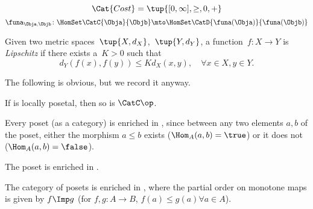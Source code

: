 {\begin{forslides}
\begin{equation*}
            \Cat{Cost}=\tup{[0,\infty], \geq, 0, +}
        \end{equation*}
        \begin{equation*}
            \label{eq:enriched_fun_a}
            \funa_{\Obja, \Objb} \colon \HomSet\CatC{\Obja}{\Objb} \mto \HomSet\CatD{\funa(\Obja)}{\funa(\Objb)}
        \end{equation*}
        \begin{definition}
            \label{def:cost_enrich_a}
            Given two metric spaces~$\tup{X,d_X}$,~$\tup{Y,d_Y}$, a function~$f\colon X\to Y$ is \emph{Lipschitz} if there exists a~$K>0$ such that
            \begin{equation}
                d_Y(f(x),f(y))\leq Kd_X(x,y),\quad \forall x\in X,y\in Y.
            \end{equation}
        \end{definition}
    \end{forslides}
}

%
The following is obvious, but we record it anyway.
\begin{lemma}
    \label{lem:loc_pos_op}
    If \CatC is locally posetal, then so is $\CatC\op$.
\end{lemma}

\begin{example}
    \label{ex:enrichbool}Every poset (as a category) is enriched in \Bool, since between any two elements $a,b$ of the poset, either the morphism $a \leq b$ exists ($\Hom_A(a,b) = \true$) or it does not ($\Hom_A(a,b) = \false$).
\end{example}

\begin{example}
    The poset \Bool is enriched in \Bool.
\end{example}

\begin{example}
    The category \Pos of posets is enriched in \Pos, where the partial order on monotone maps is given by $f \Imp g$ (\ie  for $f,g : A \to B$, $f(a) \leq g(a) \forall a \in A$).
\end{example}

